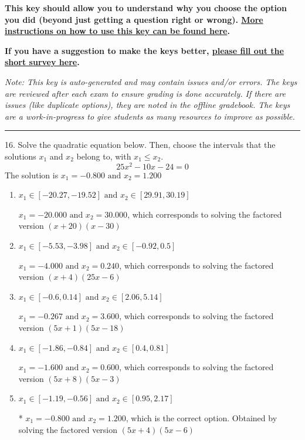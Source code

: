 \documentclass{extbook}[14pt]
\begin{document}
\textbf{This key should allow you to understand why you choose the option you did (beyond just getting a question right or wrong). \href{https://xronos.clas.ufl.edu/mac1105spring2020/courseDescriptionAndMisc/Exams/LearningFromResults}{More instructions on how to use this key can be found here}.}

\textbf{If you have a suggestion to make the keys better, \href{https://forms.gle/CZkbZmPbC9XALEE88}{please fill out the short survey here}.}

\textit{Note: This key is auto-generated and may contain issues and/or errors. The keys are reviewed after each exam to ensure grading is done accurately. If there are issues (like duplicate options), they are noted in the offline gradebook. The keys are a work-in-progress to give students as many resources to improve as possible.}

\rule{\textwidth}{0.4pt}

16. Solve the quadratic equation below. Then, choose the intervals that the solutions $x_1$ and $x_2$ belong to, with $x_1 \leq x_2$.
\[ 25x^{2} -10 x -24 = 0 \] 
The solution is $ x_1 = -0.800 \text{ and } x_2 = 1.200 $ 

\begin{enumerate}[label=\Alph*.] 
\item $ x_1 \in [-20.27, -19.52] \text{ and } x_2 \in [29.91, 30.19] $ 

 $x_1 = -20.000 \text{ and } x_2 = 30.000$, which corresponds to solving the factored version $(x + 20)(x -30)$ 
\item $ x_1 \in [-5.53, -3.98] \text{ and } x_2 \in [-0.92, 0.5] $ 

 $x_1 = -4.000 \text{ and } x_2 = 0.240$, which corresponds to solving the factored version $(x + 4)(25x -6)$ 
\item $ x_1 \in [-0.6, 0.14] \text{ and } x_2 \in [2.06, 5.14] $ 

 $x_1 = -0.267 \text{ and } x_2 = 3.600$, which corresponds to solving the factored version $(5x + 1)(5x -18)$ 
\item $ x_1 \in [-1.86, -0.84] \text{ and } x_2 \in [0.4, 0.81] $ 

 $x_1 = -1.600 \text{ and } x_2 = 0.600$, which corresponds to solving the factored version $(5x + 8)(5x -3)$ 
\item $ x_1 \in [-1.19, -0.56] \text{ and } x_2 \in [0.95, 2.17] $ 

 * $x_1 = -0.800 \text{ and } x_2 = 1.200$, which is the correct option. Obtained by solving the factored version $(5x + 4)(5x -6)$ 
\end{enumerate} 
 
\end{document}
